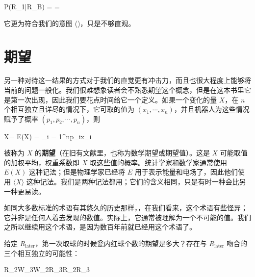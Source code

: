 \placeformula[3-65]
\startformula
P(R_1|R_{}B) =  = 
\stopformula

它更为符合我们的意图 (\in[3-57])，只是不够直观。

\section{期望}

另一种对待这一结果的方式对于我们的直觉更有冲击力，而且也很大程度上能够将当前的问题一般化。我们很难想象读者会不熟悉期望这个概念，但是在这本书里它是第一次出现，因此我们要花点时间给它一个定义。如果一个变化的量 $X$，在 $n$ 个相互独立且详尽的情况下，它可取的值为 $(x_1,\cdots,x_n)$，并且机器人为这些情况赋予了概率 $(p_1,p_2,\cdots,p_n)$，则

\placeformula[3-66]
\startformula
\langle X\rangle = E(X) = \sum_{i = 1}^np_ix_i
\stopformula

被称为 $X$ 的{\bf 期望}（在旧有文献里，也称为数学期望或期望值）。这是 $X$ 可能取值的加权平均，权重系数即 $X$ 取这些值的概率。统计学家和数学家通常使用 $E(X)$ 这种记法；但是物理学家已经将 $E$ 用于表示能量和电场了，因此他们使用 $\langle X\rangle$ 这种记法。我们是两种记法都用；它们的含义相同，只是有时一种会比另一种更易读。

如同大多数标准的术语有其悠久的历史那样，，在我们看来，这个术语有些怪异；它并非是任何人着去发现的数值。实际上，它通常被理解为一个不可能的值。我们之所以继续用这个术语，是因为数百年前就已经用这个术语了。

给定 $R_{\text{later}}$，第一次取球的时候瓮内红球个数的期望是多大？存在与 $R_{\text{later}}$ 吻合的三个相互独立的可能性：

\placeformula[3-67]
\startformula
R_2W_3\quad W_2R_3\quad R_2R_3
\stopformula
